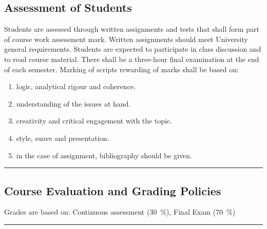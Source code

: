 \subsection*{Assessment of Students}
\begin{outline}
    \1 Students are assessed through written assignments and tests that shall form part of course work assessment mark.
    \1 Written assignments should meet University general requirements.
    \1 Students are expected to participate in class discussion and to read course material.
    \1 There shall be a three-hour final examination at the end of each semester.
    \1 Marking of scripts rewarding of marks shall be based on:
    \begin{enumerate}
        \item logic, analytical rigour and coherence.
        \item understanding of the issues at hand.
        \item creativity and critical engagement with the topic.
        \item style, suave and presentation.
        \item in the case of assignment, bibliography should be given.
    \end{enumerate}

\end{outline}
\vspace{2ex}\hrule\vspace{2ex}

\subsection*{Course Evaluation and Grading Policies}
Grades are based on:
Continuous assessment (\qty{30}{\percent}),
Final Exam (\qty{70}{\percent})
\vspace{2ex}\hrule\vspace{2ex}




